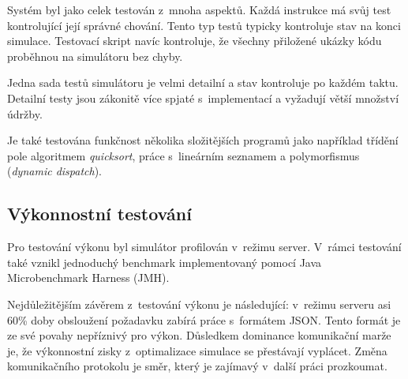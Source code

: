 Systém byl jako celek testován z~mnoha aspektů.
Každá instrukce má svůj test kontrolující její správné chování.
Tento typ testů typicky kontroluje stav na konci simulace.
Testovací skript navíc kontroluje, že všechny přiložené ukázky kódu proběhnou na simulátoru bez chyby.

Jedna sada testů simulátoru je velmi detailní a stav kontroluje po každém taktu.
Detailní testy jsou zákonitě více spjaté s~implementací a vyžadují větší množství údržby.

Je také testována funkčnost několika složitějších programů jako například třídění pole algoritmem \emph{quicksort}, práce s~lineárním seznamem a polymorfismus (\emph{dynamic dispatch}).

\subsection{Výkonnostní testování}

Pro testování výkonu byl simulátor profilován v~režimu server.
V~rámci testování také vznikl jednoduchý benchmark implementovaný pomocí Java Microbenchmark Harness (JMH).

Nejdůležitějším závěrem z~testování výkonu je následující:
v~režimu serveru asi 60\% doby obsloužení požadavku zabírá práce s~formátem JSON.
Tento formát je ze své povahy nepříznivý pro výkon.
Důsledkem dominance komunikační marže je, že výkonnostní zisky z~optimalizace simulace se přestávají vyplácet.
Změna komunikačního protokolu je směr, který je zajímavý v~další práci prozkoumat.


%
%

%
%

